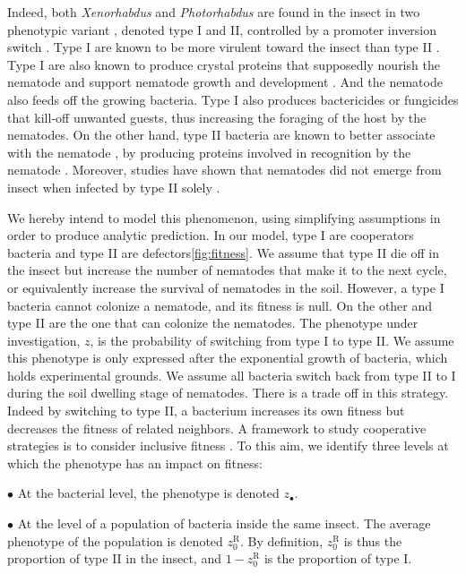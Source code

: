 \documentclass[10pt]{article}
\newcommand{\Xeno}{\textit{Xenorhabdus} }
\newcommand{\Photo}{\textit{Photorhabdus} }
\begin{document}
\begin{multicols}{2}
Indeed, both \Xeno and \Photo are found in the insect in two phenotypic variant \cite{Akhurst1982a,Forst1997}, denoted type I and II, controlled by a promoter inversion switch \cite{Somvanshi2012}. 
Type I are known to be more virulent toward the insect than type II \cite{Volgyi,Givaudan2000}. 
Type I are also known to produce crystal proteins \cite{Ciche2006,bintrim1998insertional} that supposedly nourish the nematode and support nematode growth and development \cite{Somvanshi2012}. 
And the nematode also feeds off the growing bacteria\cite{Waterfield2009}.  Type I also produces bactericides or fungicides that kill-off unwanted guests, thus increasing the foraging of the host by the nematodes.
On the other hand, type II bacteria are known to better associate with the nematode \cite{sicard2005effect}, by producing proteins involved in recognition by the nematode \cite{Somvanshi2010}. 
Moreover, studies have shown that nematodes did not emerge from insect when infected by type II solely \cite{Sugar2012}. 


We hereby intend to model this phenomenon, using simplifying assumptions in order to produce analytic prediction.  
In our model, type I are cooperators bacteria and type II are defectors\ref{fig:fitness}. 
We assume that type II die off in the insect but increase the number of nematodes that make it to the next cycle, or equivalently increase the survival of nematodes in the soil. 
However, a type I bacteria cannot colonize a nematode, and its fitness is null. 
On the other and type II are the one that can colonize the nematodes. 
The phenotype under investigation, $z$, is the probability of switching from type I to type II. We assume this phenotype is only expressed after the exponential growth of bacteria, which holds experimental grounds\cite{Somvanshi2012}.  We assume all bacteria switch back from type II to I during the soil dwelling stage of nematodes.
There is a trade off in this strategy. Indeed by switching to type II, a bacterium  increases its own fitness but decreases the fitness of related neighbors.  
A framework to study cooperative strategies is to consider inclusive fitness \cite{rousset2004genetic}.
To this aim, we identify three levels at which the phenotype has an impact on fitness:

$\bullet$ At the bacterial level, the phenotype is denoted $z_\bullet$.

$\bullet$ At the level of a population of bacteria inside the same insect. The average phenotype of the population is denoted $z_0^{\mathrm{R}}$. By definition, $z_0^{\mathrm{R}}$ is thus the proportion of type II in the insect, and $1-z_0^{\mathrm{R}}$ is the proportion of type I.


\end{multicols}
\end{document}
